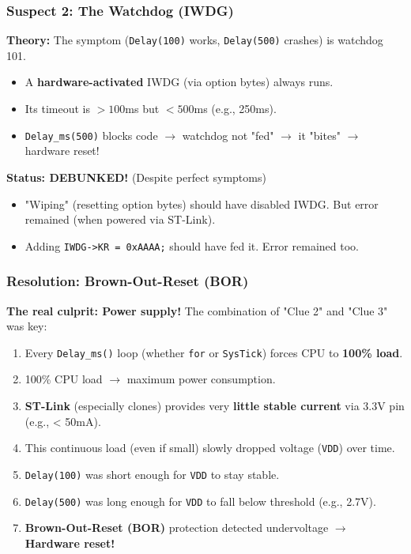 \documentclass{beamer}
\begin{document}
\begin{frame}
	\frametitle{Suspect 2: The Watchdog (IWDG)}
	\textbf{Theory:} The symptom (\texttt{Delay(100)} works, \texttt{Delay(500)} crashes)
	is watchdog 101.
	\begin{itemize}
		\item A \textbf{hardware-activated} IWDG (via option bytes) always runs.
		\item Its timeout is $> 100$ms but $< 500$ms (e.g., 250ms).
		\item \texttt{Delay\_ms(500)} blocks code $\rightarrow$ watchdog not "fed"
		$\rightarrow$ it "bites" $\rightarrow$ hardware reset!
	\end{itemize}
	\bigskip
	\textbf{Status: DEBUNKED!} (Despite perfect symptoms)
	\begin{itemize}
		\item "Wiping" (resetting option bytes) should have disabled IWDG.
		But error remained (when powered via ST-Link).
		\item Adding \texttt{IWDG->KR = 0xAAAA;} should have fed it.
		Error remained too.
	\end{itemize}
\end{frame}

\begin{frame}
	\frametitle{Resolution: Brown-Out-Reset (BOR)}
	\textbf{The real culprit: Power supply!}
	\medskip
	The combination of "Clue 2" and "Clue 3" was key:
	\begin{enumerate}
		\item Every \texttt{Delay\_ms()} loop (whether \texttt{for} or \texttt{SysTick})
		forces CPU to \textbf{100\% load}.
		\item 100\% CPU load $\rightarrow$ maximum power consumption.
		\item \textbf{ST-Link} (especially clones) provides very
		\textbf{little stable current} via 3.3V pin (e.g., < 50mA).
		\item This continuous load (even if small) slowly dropped
		voltage (\texttt{VDD}) over time.
		\item \texttt{Delay(100)} was short enough for \texttt{VDD} to stay stable.
		\item \texttt{Delay(500)} was long enough for \texttt{VDD} to fall
		below threshold (e.g., 2.7V).
		\item \textbf{Brown-Out-Reset (BOR)} protection detected undervoltage
		$\rightarrow$ \textbf{Hardware reset!}
	\end{enumerate}
\end{frame}
\end{document}
